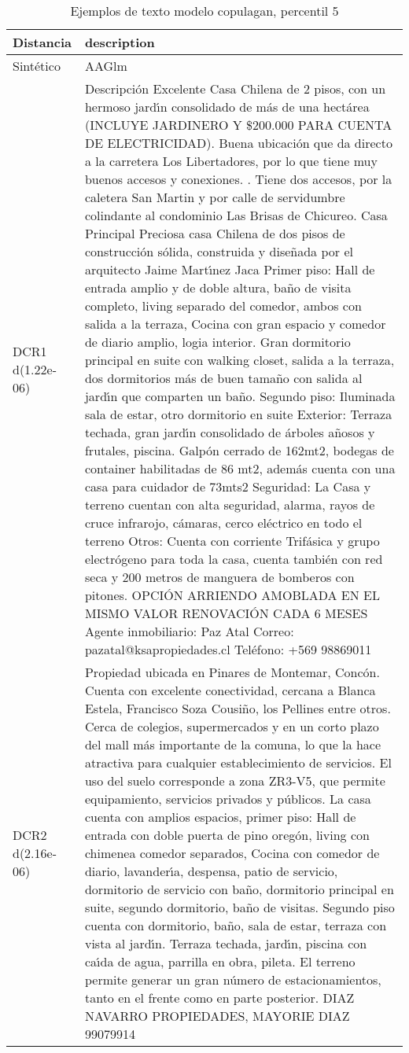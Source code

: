 \begin{table}[H]
\centering
\fontsize{10}{14}\selectfont
\caption{Ejemplos de texto modelo copulagan, percentil 5}
\label{table-example-economicos-a-2-copulagan-5p-text}
\begin{tabular}{|l|m{35em}|}
\hline
\rowcolor[gray]{0.8}
Distancia & description \\
\hline Sintético & AAGlm \\
\hline DCR1 d(1.22e-06) & Descripci\'on Excelente Casa Chilena de 2 pisos, con un hermoso jard{\'\i}n consolidado de m\'as de una hect\'area (INCLUYE JARDINERO Y \$200.000 PARA CUENTA DE ELECTRICIDAD). Buena ubicaci\'on que da directo a la carretera Los Libertadores, por lo que tiene muy buenos accesos y conexiones. . Tiene dos accesos, por la caletera San Martin y por calle de servidumbre colindante al condominio Las Brisas de Chicureo.  Casa Principal Preciosa casa Chilena de dos pisos de construcci\'on s\'olida, construida y dise\~nada por el arquitecto Jaime Mart{\'\i}nez Jaca  Primer piso: Hall de entrada amplio y de doble altura, ba\~no de visita completo, living separado del comedor, ambos con salida a la terraza, Cocina con gran espacio y comedor de diario amplio, logia interior. Gran dormitorio principal en suite con walking closet, salida a la terraza, dos dormitorios m\'as de buen tama\~no con salida al jard{\'\i}n que comparten un ba\~no.  Segundo piso: Iluminada sala de estar, otro dormitorio en suite  Exterior: Terraza techada, gran jard{\'\i}n consolidado de \'arboles a\~nosos y frutales, piscina. Galp\'on cerrado de 162mt2, bodegas de container habilitadas de 86 mt2, adem\'as cuenta con una casa para cuidador de 73mts2  Seguridad: La Casa y terreno cuentan con alta seguridad, alarma, rayos de cruce infrarojo, c\'amaras, cerco el\'ectrico en todo el terreno  Otros: Cuenta con corriente Trif\'asica y grupo electr\'ogeno para toda la casa, cuenta tambi\'en con red seca y 200 metros de manguera de bomberos con pitones.  OPCI\'ON ARRIENDO AMOBLADA EN EL MISMO VALOR RENOVACI\'ON CADA 6 MESES  Agente inmobiliario: Paz Atal  Correo: pazatal@ksapropiedades.cl Tel\'efono: +569 98869011 \\
\hline DCR2 d(2.16e-06) & Propiedad ubicada en Pinares de Montemar, Conc\'on. Cuenta con excelente conectividad, cercana a Blanca Estela, Francisco Soza Cousi\~no, los Pellines entre otros. Cerca de colegios, supermercados y en un corto plazo del mall m\'as importante de la comuna, lo que la hace atractiva para cualquier establecimiento de servicios. El uso del suelo corresponde a zona ZR3-V5, que permite equipamiento, servicios privados y p\'ublicos.  La casa cuenta con amplios espacios, primer piso: Hall de entrada con doble puerta de pino oreg\'on, living con chimenea comedor separados, Cocina con comedor de diario, lavander{\'\i}a, despensa, patio de servicio, dormitorio de servicio con ba\~no, dormitorio principal en suite, segundo dormitorio, ba\~no de visitas. Segundo piso cuenta con dormitorio, ba\~no, sala de estar, terraza con vista al jard{\'\i}n.  Terraza techada, jard{\'\i}n, piscina con ca{\'\i}da de agua, parrilla en obra, pileta.  El terreno permite generar un gran n\'umero de estacionamientos, tanto en el frente como en parte posterior.  DIAZ NAVARRO PROPIEDADES, MAYORIE DIAZ 99079914 \\

\end{tabular}
\end{table}
